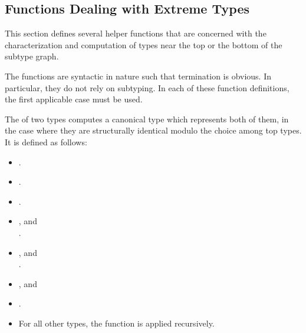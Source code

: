 \documentclass[makeidx]{article}
\begin{document}


\subsection{Functions Dealing with Extreme Types}

\LMHash{}%
This section defines several helper functions that are concerned with
the characterization and computation of types near the top or the bottom
of the subtype graph.

\LMHash{}%
The functions are syntactic in nature such that termination is obvious.
In particular, they do not rely on subtyping.
In each of these function definitions,
the first applicable case must be used.

\LMHash{}%
The \Index{\TopMergeTypeName} of two types computes
a canonical type which represents both of them,
in the case where they are structurally identical
modulo the choice among top types.
It is defined as follows:

\begin{itemize}
\item {}.
\item \DefEquals{\TopMergeType{\DYNAMIC}{\DYNAMIC}}{\code{\DYNAMIC}}.
\item \DefEquals{\TopMergeType{\VOID}{\VOID}}{\code{\VOID}}.
\item {}, and\\
  .
\item {}, and\\
  .
\item {}, and\\
\item {}.
\item For all other types, the function is applied recursively.

\end{itemize}
\end{document}
